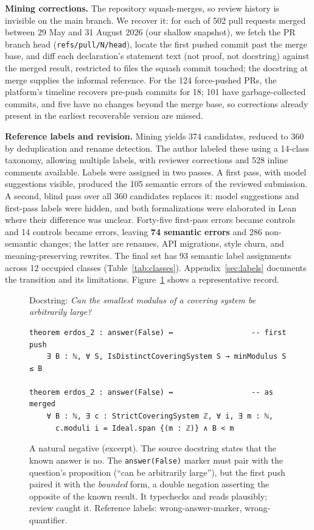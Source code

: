\documentclass{article}
\begin{document}
\textbf{Mining corrections.} The repository squash-merges, so review history
is invisible on the main branch. We recover it: for each of 502 pull requests
merged between 29 May and 31 August 2026 (our shallow snapshot), we fetch the
PR branch head (\texttt{refs/pull/N/head}), locate the first pushed commit
past the merge base, and diff each declaration's statement text (not proof,
not docstring) against the merged result, restricted to files the squash
commit touched; the docstring at merge supplies the informal reference. For
the 124 force-pushed PRs, the platform's timeline recovers pre-push commits
for 18; 101 have garbage-collected commits, and five have no changes beyond
the merge base, so corrections already present in the earliest recoverable
version are missed.

\textbf{Reference labels and revision.} Mining yields 374 candidates, reduced
to 360 by deduplication and rename detection. The author labeled these using
a 14-class taxonomy, allowing multiple labels, with reviewer corrections and
528 inline comments available. Labels were assigned in two passes. A first pass, with model suggestions
visible, produced the 105 semantic errors of the reviewed submission. A
second, blind pass over all 360 candidates replaces it: model suggestions
and first-pass labels were hidden, and both formalizations were elaborated
in Lean where their difference was unclear. Forty-five first-pass errors became
controls and 14 controls became errors, leaving \textbf{74 semantic errors}
and 286 non-semantic changes; the latter are renames, API migrations, style
churn, and meaning-preserving rewrites. The final set has 93 semantic label assignments across 12 occupied classes
(Table~\ref{tab:classes}). Appendix~\ref{sec:labels} documents the transition and its limitations.
Figure~\ref{fig:example} shows a representative record.

\begin{figure}[t]\footnotesize
Docstring: \emph{Can the smallest modulus of a covering system be
arbitrarily large?}
\begin{verbatim}
theorem erdos_2 : answer(False) ↔                  -- first push
    ∃ B : ℕ, ∀ S, IsDistinctCoveringSystem S → minModulus S ≤ B

theorem erdos_2 : answer(False) ↔                  -- as merged
    ∀ B : ℕ, ∃ c : StrictCoveringSystem ℤ, ∀ i, ∃ m : ℕ,
      c.moduli i = Ideal.span {(m : ℤ)} ∧ B < m
\end{verbatim}
\caption{A natural negative (excerpt). The source docstring states that the
known answer is no. The \texttt{answer(False)} marker must pair with the
question's proposition (``can be arbitrarily large''), but the first push
paired it with the \emph{bounded} form, a double negation asserting the
opposite of the known result. It typechecks and reads plausibly; review
caught it. Reference labels: wrong-answer-marker, wrong-quantifier.}
\label{fig:example}
\end{figure}
\end{document}
